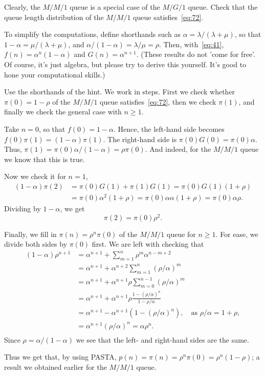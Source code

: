 \documentclass[companion]{subfiles}
\begin{document}
\begin{exercise}
 Clearly, the $M/M/1$ queue is a special case of the $M/G/1$ queue.
 Check that the queue length distribution of the $M/M/1$ queue satisfies~\cref{eq:72}.
\begin{hint}
 To simplify the computations, define shorthands such as $\alpha=\lambda/(\lambda+\mu)$, so that $1-\alpha = \mu/(\lambda+\mu)$, and $\alpha/(1-\alpha) = \lambda /\mu = \rho$.
 Then, with~\cref{eq:41}, $f(n) = \alpha^n(1-\alpha)$ and $G(n) = \alpha^{n+1}$.
 (These results do not 'come for free'.
 Of course, it's just algebra, but please try to derive this yourself.
 It's good to hone your computational skills.)
\end{hint}
\begin{solution}
Use the shorthands of the hint. We work in steps. First we check whether $\pi(0)=1-\rho$ of the $M/M/1$ queue satisfies~\cref{eq:72}, then we check $\pi(1)$, and finally we check the general case with $n\geq 1$. 

Take $n=0$, so that $f(0)=1-\alpha$. Hence, the left-hand side becomes $f(0) \pi(1) = (1-\alpha)\pi(1)$. The right-hand side is
 $\pi(0)G(0) = \pi(0)\alpha$. Thus,
 $\pi(1) = \pi(0)\alpha/(1-\alpha) = \rho \pi(0)$. And indeed, for the $M/M/1$ queue we know that this is true. 

Now we check it for $n=1$,
\begin{equation*}
 \begin{split}
 (1-\alpha) \pi(2) 
&= \pi(0)G(1) + \pi(1)G(1) = \pi(0)G(1)(1+\rho) \\
&= \pi(0)\alpha^2(1+\rho) = \pi(0)\alpha \alpha (1+\rho) = \pi(0)\alpha \rho.
 \end{split}
\end{equation*}
Dividing by $1-\alpha$, we get
\begin{equation*}
 \pi(2) = \pi(0)\rho^2.
\end{equation*}

Finally, we fill in $\pi(n) = \rho^n \pi(0)$ of the $M/M/1$ queue for $n\geq 1$.
For ease, we divide both sides by $\pi(0)$ first.
We are left with checking that
\begin{align*}
 (1-\alpha)\rho^{n+1} 
&= \alpha^{n+1} + \sum_{m=1}^n \rho^m \alpha^{n-m+2} \\
&= \alpha^{n+1} + \alpha^{n+2}\sum_{m=1}^n (\rho/\alpha)^m \\
&= \alpha^{n+1} + \alpha^{n+1}\rho \sum_{m=0}^{n-1} (\rho/\alpha)^m \\
&= \alpha^{n+1} + \alpha^{n+1}\rho \frac{1-(\rho/\alpha)^n}{1-\rho/\alpha}\\
&= \alpha^{n+1} - \alpha^{n+1}(1-(\rho/\alpha)^n), \quad\text{as } \rho/\alpha = 1+\rho,\\
&= \alpha^{n+1}(\rho/\alpha)^n = \alpha \rho^n.\\
\end{align*}
Since $\rho=\alpha/(1-\alpha)$ we see that the left- and right-hand sides are the same. 

Thus we get that, by using PASTA, $p(n) = \pi(n) = \rho^n \pi(0) = \rho^n (1-\rho)$; a result we
obtained earlier for the $M/M/1$ queue.
\end{solution}
\end{exercise}
\end{document}
